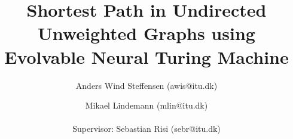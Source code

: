 \documentclass{article}
\author{Anders Wind Steffensen (awis@itu.dk)\and Mikael Lindemann (mlin@itu.dk)\\\\Supervisor: Sebastian Risi (sebr@itu.dk)}
\title{Shortest Path in Undirected Unweighted Graphs using Evolvable Neural Turing Machine}
\begin{document}

\maketitle
\tableofcontents
\listoftodos
\newpage







\clearpage


\newpage


\end{document}
